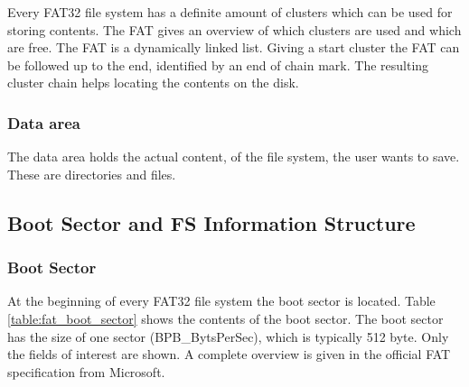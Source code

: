 Every FAT32 file system has a definite amount of clusters which can be used for storing contents. The FAT gives an overview of which clusters are used and which are free. The FAT is a dynamically linked list. Giving a start cluster the FAT can be followed up to the end, identified by an end of chain mark. The resulting cluster chain helps locating the contents on the disk.

\subsubsection{Data area}

The data area holds the actual content, of the file system, the user wants to save. These are directories and files.

\subsection{Boot Sector and FS Information Structure}

\subsubsection{Boot Sector}

At the beginning of every FAT32 file system the boot sector is located. Table \ref{table:fat_boot_sector} shows the contents of the boot sector. The boot sector has the size of one sector (BPB\_BytsPerSec), which is typically 512 byte. Only the fields of interest are shown. A complete overview is given in the official FAT specification from Microsoft\cite{fatgen103}.

